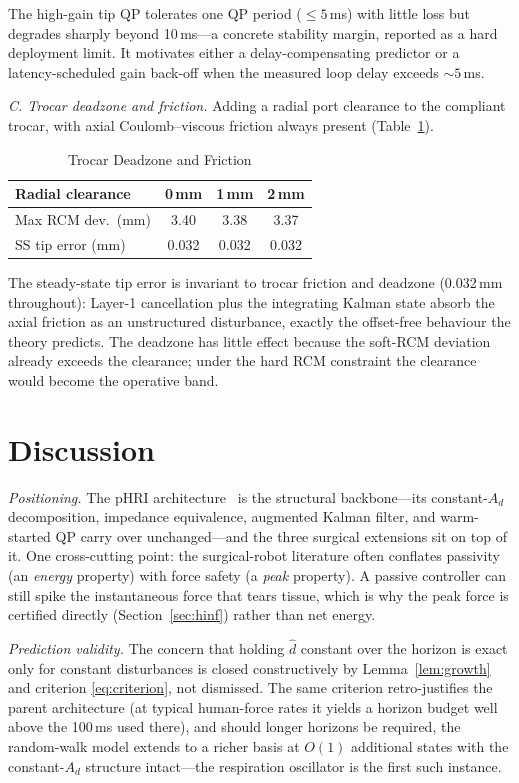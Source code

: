 The high-gain tip QP tolerates one QP period ($\le5$\,ms) with little loss but degrades sharply beyond 10\,ms---a concrete stability margin, reported as a hard deployment limit. It motivates either a delay-compensating predictor or a latency-scheduled gain back-off when the measured loop delay exceeds ${\sim}5$\,ms.

\emph{C. Trocar deadzone and friction.} Adding a radial port clearance to the compliant trocar, with axial Coulomb--viscous friction always present (Table~\ref{tab:deadzone}).

\begin{table}[!t]
\caption{Trocar Deadzone and Friction}
\label{tab:deadzone}
\centering
\footnotesize
\setlength{\tabcolsep}{6pt}
\begin{tabular}{lccc}
\toprule
Radial clearance & 0\,mm & 1\,mm & 2\,mm \\
\midrule
Max RCM dev.\ (mm) & 3.40 & 3.38 & 3.37 \\
SS tip error (mm) & 0.032 & 0.032 & 0.032 \\
\bottomrule
\end{tabular}
\end{table}

The steady-state tip error is invariant to trocar friction and deadzone (0.032\,mm throughout): Layer-1 cancellation plus the integrating Kalman state absorb the axial friction as an unstructured disturbance, exactly the offset-free behaviour the theory predicts. The deadzone has little effect because the soft-RCM deviation already exceeds the clearance; under the hard RCM constraint the clearance would become the operative band.

\section{Discussion}\label{sec:discussion}

\emph{Positioning.} The pHRI architecture~\cite{cao2026phri} is the structural backbone---its constant-$A_d$ decomposition, impedance equivalence, augmented Kalman filter, and warm-started QP carry over unchanged---and the three surgical extensions sit on top of it. One cross-cutting point: the surgical-robot literature often conflates passivity (an \emph{energy} property) with force safety (a \emph{peak} property). A passive controller can still spike the instantaneous force that tears tissue, which is why the peak force is certified directly (Section~\ref{sec:hinf}) rather than net energy.

\emph{Prediction validity.} The concern that holding $\hat d$ constant over the horizon is exact only for constant disturbances is closed constructively by Lemma~\ref{lem:growth} and criterion \eqref{eq:criterion}, not dismissed. The same criterion retro-justifies the parent architecture (at typical human-force rates it yields a horizon budget well above the 100\,ms used there), and should longer horizons be required, the random-walk model extends to a richer basis at $O(1)$ additional states with the constant-$A_d$ structure intact---the respiration oscillator is the first such instance.

